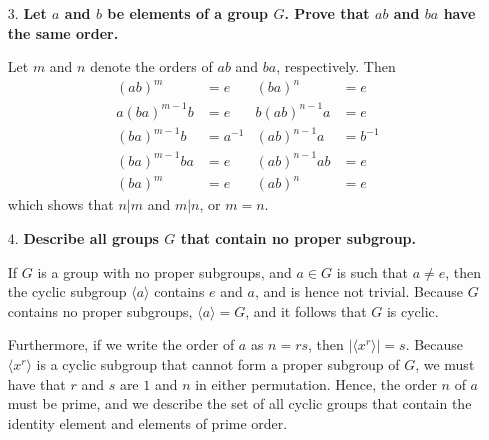 \documentclass[a4paper,12pt]{article}
\begin{document}
\begin{enumerate}
    \item[3.]
        \boldmath
        \textbf{Let $a$ and $b$ be elements of a group $G$. Prove that $ab$ and $ba$ have the same order.} \par
        \unboldmath
        Let $m$ and $n$ denote the orders of $ab$ and $ba$, respectively. Then
        \begin{align*}
            (ab)^m &= e              & (ba)^n &= e \\
            a(ba)^{m - 1} b &= e     & b(ab)^{n - 1} a &= e \\
            (ba)^{m - 1} b &= a^{-1} & (ab)^{n - 1} a &= b^{-1} \\
            (ba)^{m - 1} ba &= e     & (ab)^{n - 1} ab &= e \\
            (ba)^m &= e              & (ab)^n &= e
        \end{align*}
        which shows that $n | m$ and $m | n$, or $m = n$.
        \iffalse
            Assume, for the purpose of contradiction, that $ab$ and $ba$ do not have the same order. Without loss of generality, let $ab$ have the smaller order, which we denote by $n$. Then
            \begin{gather*}
                (ab)^n = a^n b^n = e \\
                \Rightarrow a^n = \left( b^n \right)^{-1} \\
                \Rightarrow (ba)^n = b^n a^n = b^n \left( b^n \right)^{-1} = e,
            \end{gather*}
            which shows that $ba$ has order at most $n$, a contradiction. Hence, $ab$ and $ba$ have the same order.
        \fi

    \item[4.]
        \boldmath
        \textbf{Describe all groups $G$ that contain no proper subgroup.} \par
        \unboldmath
        If $G$ is a group with no proper subgroups, and $a \in G$ is such that $a \neq e$, then the cyclic subgroup $\langle a \rangle$ contains $e$ and $a$, and is hence not trivial. Because $G$ contains no proper subgroups, $\langle a \rangle = G$, and it follows that $G$ is cyclic. \par
        Furthermore, if we write the order of $a$ as $n = rs$, then $|\langle x^r \rangle | = s$. Because $\langle x^r \rangle$ is a cyclic subgroup that cannot form a proper subgroup of $G$, we must have that $r$ and $s$ are $1$ and $n$ in either permutation. Hence, the order $n$ of $a$ must be prime, and we describe the set of all cyclic groups that contain the identity element and elements of prime order.


\end{enumerate}
\end{document}
